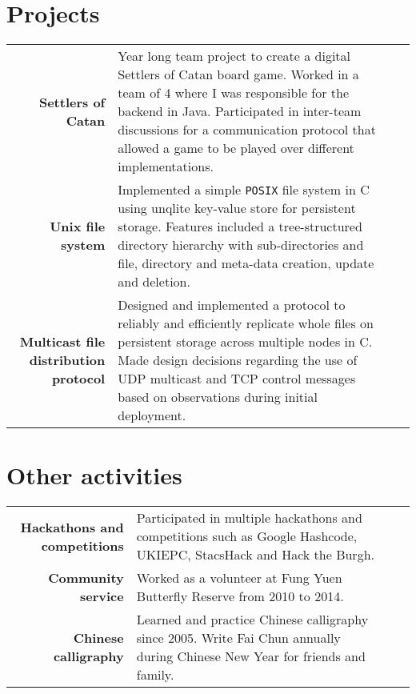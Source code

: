 \documentclass{article}
\newcommand{\n}[0]{\\[\baselineskip]}
\begin{document}
\section*{Projects}
\begin{tabular}{R|p{15cm}}
\textbf{Settlers of Catan} & Year long team project to create a digital Settlers of Catan board game. Worked in a team of 4 where I was responsible for the backend in Java. Participated in inter-team discussions for a communication protocol that allowed a game to be played over different implementations. \n

\textbf{Unix file system} & Implemented a simple \texttt{POSIX} file system in C using unqlite key-value store for persistent storage. Features included a tree-structured directory hierarchy with sub-directories and file, directory and meta-data creation, update and deletion.\n

\textbf{Multicast file distribution protocol} & Designed and implemented a protocol to reliably and efficiently replicate whole files on persistent storage across multiple nodes in C. Made design decisions regarding the use of UDP multicast and TCP control messages based on observations during initial deployment.\\

\end{tabular}


\section*{Other activities}
\begin{tabular}{R|p{15cm}}
\textbf{Hackathons and competitions} & Participated in multiple hackathons and competitions such as Google Hashcode, UKIEPC, StacsHack and Hack the Burgh. \n

\textbf{Community service} & Worked as a volunteer at Fung Yuen Butterfly Reserve from 2010 to 2014. \n

\textbf{Chinese calligraphy} & Learned and practice Chinese calligraphy since 2005. Write Fai Chun annually during Chinese New Year for friends and family. 
\end{tabular}
\end{document}
